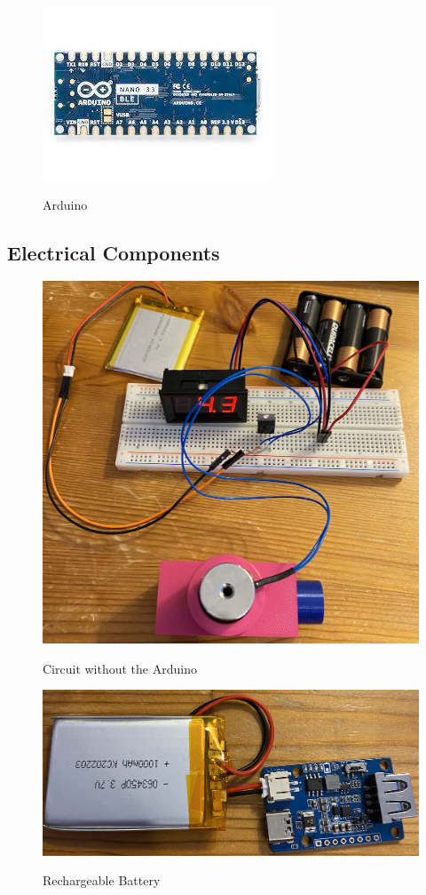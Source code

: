 \documentclass[12pt, titlepage]{article}
\begin{document}
 \begin{figure}[ht]
 \begin{center}
 {
  \includegraphics[width=0.3\linewidth]{arduino.png}
 }
 \caption{\label{Arduino} Arduino}
 \end{center}
 \end{figure}
 \newpage

\subsection{Electrical Components}

 \begin{figure}[ht]
 \begin{center}
 {
  \includegraphics[width=0.5\linewidth]{6.png}
 }
 \caption{\label{Circuit} Circuit without the Arduino}
 \end{center}
 \end{figure}
 
  \begin{figure}[ht]
 \begin{center}
 {
  \includegraphics[width=0.5\linewidth]{8.png}
 }
 \caption{\label{Rechargeable Battery} Rechargeable Battery}
 \end{center}
 \end{figure}
 
\end{document}
